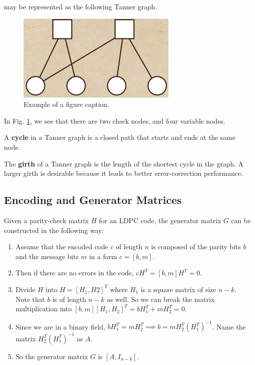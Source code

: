 \documentclass[conference]{IEEEtran}
\begin{document}
may be represented as the following Tanner graph.

\begin{figure}[htbp]
  \centerline{\includegraphics{Images/tanner_graph.png}}
  \caption{Example of a figure caption.}
  \label{fig}
\end{figure}

In Fig. \ref{fig}, we see that there are two check nodes, and four variable nodes.

A \textbf{cycle} in a Tanner graph is a closed path that starts and ends at the same node.

The \textbf{girth} of a Tanner graph is the length of the shortest cycle in the graph.
A larger girth is desirable because it leads to better error-correction performance.

\subsection{Encoding and Generator Matrices}
Given a parity-check matrix $H$ for an LDPC code, the generator matrix $G$ can
be constructed in the following way:
\begin{enumerate}
  \item Assume that the encoded code $c$ of length $n$ is composed of the parity bits
        $b$ and the message bits $m$ in a form $c = [b, m]$.
  \item Then if there are no errors in the code, $cH^T = [b, m]H^T = 0$.
  \item Divide $H$ into $H = [H_1, H2]^T$ where $H_1$ is a square matrix of size $n-k$.
        Note that $b$ is of length $n-k$ as well. So we can break the matrix
        multiplication into $[b, m][H_1, H_2]^T = bH_1^T + mH_2^T = 0$.
  \item Since we are in a binary field, $bH_1^T = mH_2^T \implies b =
          mH_2^T(H_1^T)^{-1}$. Name the matrix $H_2^T(H_1^T)^{-1}$ as $A$.
  \item So the generator matrix $G$ is $[A, I_{n-k}]$.
\end{enumerate}
\end{document}
